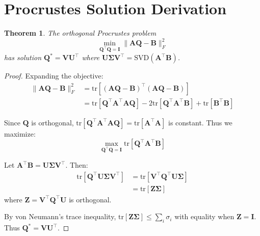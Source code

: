 \documentclass[11pt,twocolumn]{article}
\newtheorem{theorem}{Theorem}
\begin{document}

\clearpage
\onecolumn




\appendix

\section{Procrustes Solution Derivation}
\label{app:procrustes}

\begin{theorem}
The orthogonal Procrustes problem
\begin{equation}
\min_{\mathbf{Q}^\top\mathbf{Q} = \mathbf{I}} \|\mathbf{A}\mathbf{Q} - \mathbf{B}\|_F^2
\end{equation}
has solution $\mathbf{Q}^* = \mathbf{V}\mathbf{U}^\top$ where $\mathbf{U}\mathbf{\Sigma}\mathbf{V}^\top = \text{SVD}(\mathbf{A}^\top\mathbf{B})$.
\end{theorem}

\begin{proof}
Expanding the objective:
\begin{align}
\|\mathbf{A}\mathbf{Q} - \mathbf{B}\|_F^2 &= \text{tr}[(\mathbf{A}\mathbf{Q} - \mathbf{B})^\top(\mathbf{A}\mathbf{Q} - \mathbf{B})] \\
&= \text{tr}[\mathbf{Q}^\top\mathbf{A}^\top\mathbf{A}\mathbf{Q}] - 2\text{tr}[\mathbf{Q}^\top\mathbf{A}^\top\mathbf{B}] + \text{tr}[\mathbf{B}^\top\mathbf{B}]
\end{align}

Since $\mathbf{Q}$ is orthogonal, $\text{tr}[\mathbf{Q}^\top\mathbf{A}^\top\mathbf{A}\mathbf{Q}] = \text{tr}[\mathbf{A}^\top\mathbf{A}]$ is constant. Thus we maximize:
\begin{equation}
\max_{\mathbf{Q}^\top\mathbf{Q} = \mathbf{I}} \text{tr}[\mathbf{Q}^\top\mathbf{A}^\top\mathbf{B}]
\end{equation}

Let $\mathbf{A}^\top\mathbf{B} = \mathbf{U}\mathbf{\Sigma}\mathbf{V}^\top$. Then:
\begin{align}
\text{tr}[\mathbf{Q}^\top\mathbf{U}\mathbf{\Sigma}\mathbf{V}^\top] &= \text{tr}[\mathbf{V}^\top\mathbf{Q}^\top\mathbf{U}\mathbf{\Sigma}] \\
&= \text{tr}[\mathbf{Z}\mathbf{\Sigma}]
\end{align}
where $\mathbf{Z} = \mathbf{V}^\top\mathbf{Q}^\top\mathbf{U}$ is orthogonal.

By von Neumann's trace inequality, $\text{tr}[\mathbf{Z}\mathbf{\Sigma}] \leq \sum_i \sigma_i$ with equality when $\mathbf{Z} = \mathbf{I}$. Thus $\mathbf{Q}^* = \mathbf{V}\mathbf{U}^\top$.
\end{proof}
\end{document}
